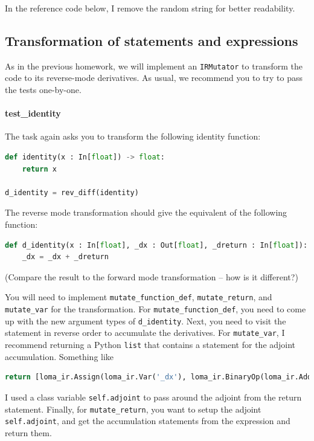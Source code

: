 In the reference code below, I remove the random string for better readability.

\subsection{Transformation of statements and expressions}
As in the previous homework, we will implement an \lstinline{IRMutator} to transform the code to its reverse-mode derivatives. As usual, we recommend you to try to pass the tests one-by-one. 

\paragraph{test_identity} The task again asks you to transform the following identity function:
\begin{lstlisting}[language=Python]
def identity(x : In[float]) -> float:
    return x

d_identity = rev_diff(identity)
\end{lstlisting}
The reverse mode transformation should give the equivalent of the following function:
\begin{lstlisting}[language=Python]
def d_identity(x : In[float], _dx : Out[float], _dreturn : In[float]):
	_dx = _dx + _dreturn
\end{lstlisting}
(Compare the result to the forward mode transformation -- how is it different?)

You will need to implement \lstinline{mutate_function_def}, \lstinline{mutate_return}, and \lstinline{mutate_var} for the transformation. For \lstinline{mutate_function_def}, you need to come up with the new argument types of \lstinline{d_identity}. Next, you need to visit the statement in reverse order to accumulate the derivatives. For \lstinline{mutate_var}, I recommend returning a Python \lstinline{list} that contains a statement for the adjoint accumulation. Something like 
\begin{lstlisting}[language=Python]
return [loma_ir.Assign(loma_ir.Var('_dx'), loma_ir.BinaryOp(loma_ir.Add(), loma_ir.Var('_dx'), loma_ir.Var('_dreturn')))]
\end{lstlisting}
I used a class variable \lstinline{self.adjoint} to pass around the adjoint from the return statement.
Finally, for \lstinline{mutate_return}, you want to setup the adjoint \lstinline{self.adjoint}, and get the accumulation statements from the expression and return them.

